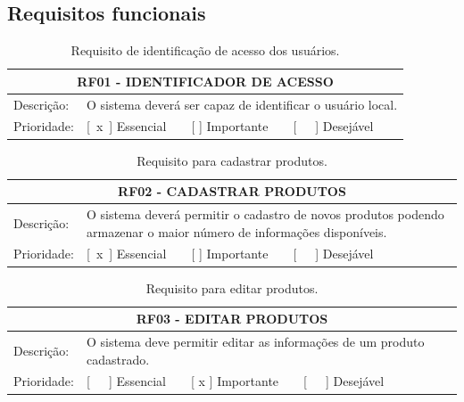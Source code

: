 \begin{anexosenv}
	
	\partanexos
	
	\chapter{Requisitos funcionais}
	
	\begin{table}[htbp]
\centering
\caption{Requisito de identificação de acesso dos usuários.}
\label{tab:rf01}
\begin{tabular}{l p{10cm}}
\toprule
\multicolumn{2}{c}{RF01 - IDENTIFICADOR DE ACESSO} \\ \midrule
Descrição:  & O sistema deverá ser capaz de identificar o usuário local.  \\ \midrule
Prioridade: & [ x ] Essencial    [   ] Importante    [   ] Desejável \\ \bottomrule
\end{tabular}
\end{table}


\begin{table}[htbp]
\centering
\caption{Requisito para cadastrar produtos.}
\label{tab:rf02}
\begin{tabular}{l p{10cm}}
\toprule
\multicolumn{2}{c}{RF02 - CADASTRAR PRODUTOS} \\ \midrule
Descrição:  & O sistema deverá permitir o cadastro de novos produtos podendo armazenar o maior número de informações disponíveis.\\ \midrule
Prioridade: & [ x ] Essencial    [   ] Importante    [   ] Desejável \\ \bottomrule
\end{tabular}
\end{table}

\begin{table}[htbp]
\centering
\caption{Requisito para editar produtos.}
\label{tab:rf03}
\begin{tabular}{l p{10cm}}
\toprule
\multicolumn{2}{c}{RF03 - EDITAR PRODUTOS} \\ \midrule
Descrição:  & O sistema deve permitir editar as informações de um produto cadastrado.\\ \midrule
Prioridade: & [   ] Essencial    [ x ] Importante    [   ] Desejável \\ \bottomrule
\end{tabular}
\end{table}


\end{anexosenv}
